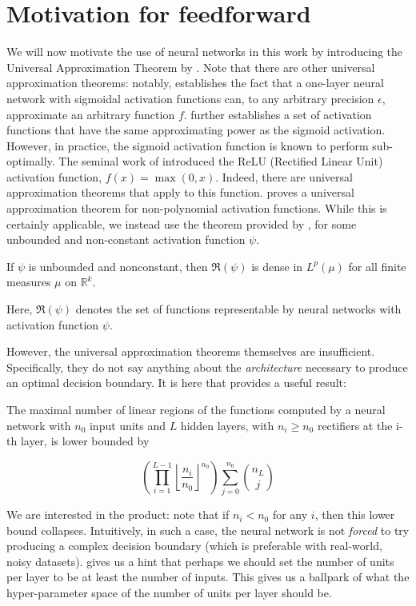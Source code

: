\section{Motivation for feedforward}
We will now motivate the use of neural networks in this work by introducing the Universal Approximation Theorem by \citet{hornik1991approximation}. Note that there are other universal approximation theorems: notably, \citet{cybenko1989approximation} establishes the fact that a one-layer neural network with sigmoidal activation functions can, to any arbitrary precision $\epsilon$, approximate an arbitrary function $f$. \citet{dasgupta1992power} further establishes a set of activation functions that have the same approximating power as the sigmoid activation. However, in practice, the sigmoid activation function is known to perform sub-optimally. The seminal work of \citet{nair2010rectified} introduced the ReLU (Rectified Linear Unit) activation function, $f(x) = \max(0, x)$. Indeed, there are universal approximation theorems that apply to this function. \citet{leshno1993multilayer} proves a universal approximation theorem for non-polynomial activation functions. While this is certainly applicable, we instead use the theorem provided by \citet{hornik1991approximation}, for some unbounded and non-constant activation function $\psi$.

\begin{theorem}
\label{th:relu_uat}
    If $\psi$ is unbounded and nonconstant, then $\mathfrak{R}(\psi)$ is dense in $L^p(\mu)$ for all finite measures $\mu$ on $\mathbb{R}^k$.
\end{theorem}

Here, $\mathfrak{R}(\psi)$ denotes the set of functions representable by neural networks with activation function $\psi$.

However, the universal approximation theorems themselves are insufficient. Specifically, they do not say anything about the \textit{architecture} necessary to produce an optimal decision boundary. It is here that \citet{montufar2014number} provides a useful result:

\begin{theorem}
    The maximal number of linear regions of the functions computed by a neural network with $n_0$ input units and $L$ hidden layers, with $n_i \geq n_0$ rectifiers at the i-th layer, is lower bounded by
         
    \[
        \left( \prod\limits_{i=1}^{L-1} \left\lfloor \frac{n_i}{n_0} \right\rfloor ^{n_0} \right) \sum\limits_{j=0}^{n_0} {n_L \choose j}
    \]
\end{theorem}

We are interested in the product: note that if $n_i < n_0$ for any $i$, then this lower bound collapses. Intuitively, in such a case, the neural network is not \textit{forced} to try producing a complex decision boundary (which is preferable with real-world, noisy datasets). \citet{montufar2014number} gives us a hint that perhaps we should set the number of units per layer to be at least the number of inputs. This gives us a ballpark of what the hyper-parameter space of the number of units per layer should be.